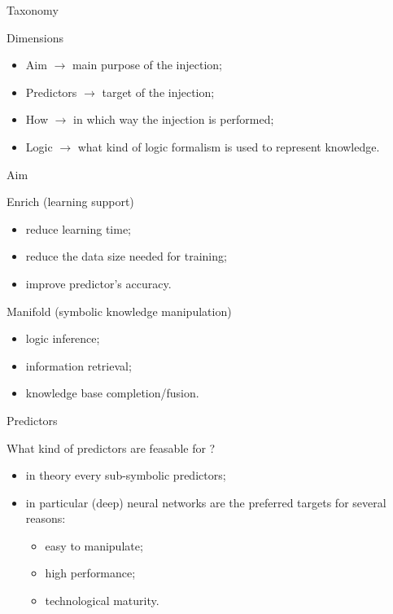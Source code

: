 \documentclass[presentation]{beamer}\mode<presentation>{\usetheme{AMSBolognaFC}}
\begin{document}
\begin{frame}[c]{Taxonomy}
    \begin{block}{Dimensions}
        \begin{itemize}
            \item Aim $\rightarrow$ main purpose of the injection;
            \item Predictors $\rightarrow$ target of the injection;
            \item How $\rightarrow$ in which way the injection is performed;
            \item Logic $\rightarrow$ what kind of logic formalism is used to represent knowledge.
        \end{itemize}
    \end{block}
\end{frame}
    
\begin{frame}[c]{Aim}
    \begin{block}{Enrich (learning support)}
        \begin{itemize}
            \item reduce learning time;
            \item reduce the data size needed for training;
            \item improve predictor's accuracy.
        \end{itemize}
    \end{block}
    \begin{block}{Manifold (symbolic knowledge manipulation)}
    \begin{itemize}
        \item logic inference;
        \item information retrieval;
        \item knowledge base completion/fusion.
    \end{itemize}
    \end{block}
\end{frame}

\begin{frame}[c]{Predictors}
    \begin{block}{What kind of predictors are feasable for \ski?}
        \begin{itemize}
            \item in theory every sub-symbolic predictors;
            \item in particular (deep) neural networks are the preferred targets for several reasons:
            \begin{itemize}
                \item easy to manipulate;
                \item high performance;
                \item technological maturity.
            \end{itemize}
        \end{itemize}
    \end{block}
\end{frame}
\end{document}
